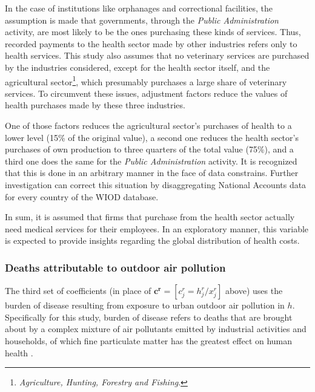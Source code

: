 \documentclass[a4paper,12pt, ]{article}
\begin{document}
In the case of institutions like orphanages and correctional facilities, the assumption is made that governments, through the \textit{Public Administration} activity, are most likely to be the ones purchasing these kinds of services. Thus, recorded payments to the health sector made by other industries refers only to health services. 
This study also assumes that no veterinary services are purchased by the industries considered, except for the health sector itself, and the agricultural sector\footnote{\textit{Agriculture, Hunting, Forestry and Fishing}.}, which presumably purchases a large share of veterinary services. To circumvent these issues, adjustment factors reduce the values of health purchases made by these three industries.

One of those factors reduces the agricultural sector's purchases of health to a lower level (15\% of the original value), a second one reduces the health sector's purchases of own production to three quarters of the total value (75\%), and a third one does the same for the \textit{Public Administration} activity. It is recognized that this is done in an arbitrary manner in the face of data constrains. Further investigation can correct this situation by disaggregating National Accounts data for every country of the WIOD database.

In sum, it is assumed that firms that purchase from the health sector actually need medical services for their employees. In an exploratory manner, this variable is expected to provide insights regarding the global distribution of health costs.


\subsubsection{Deaths attributable to outdoor air pollution} \label{subsec:polludeath}

The third set of coefficients (in place of $\mathbf{c^r}=[c^r_{j}=h^r_j/x^r_j]$ above) uses the burden of disease resulting from exposure to urban outdoor air pollution in $h$. Specifically for this study, burden of disease refers to deaths that are brought about by a complex mixture of air pollutants emitted by industrial activities and households, of which fine particulate matter has the greatest effect on human health \citep{cohenurban2004}.
\end{document}
